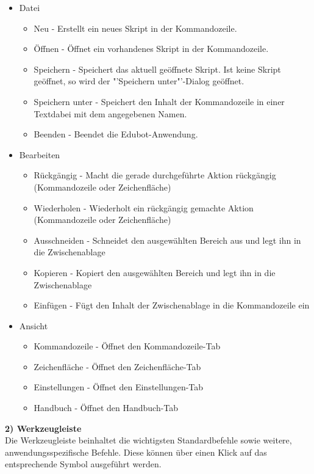 \begin{itemize}
\item Datei
\begin{itemize}
\item Neu - Erstellt ein neues Skript in der Kommandozeile.
\item Öffnen - Öffnet ein vorhandenes Skript in der Kommandozeile.
\item Speichern - Speichert das aktuell geöffnete Skript. Ist keine Skript geöffnet, so wird der "'Speichern unter"'-Dialog geöffnet.
\item Speichern unter - Speichert den Inhalt der Kommandozeile in einer Textdabei mit dem angegebenen Namen.
\item Beenden - Beendet die Edubot-Anwendung.
\end{itemize}
\item Bearbeiten
\begin{itemize}
\item Rückgängig - Macht die gerade durchgeführte Aktion rückgängig (Kommandozeile oder Zeichenfläche)
\item Wiederholen - Wiederholt ein rückgängig gemachte Aktion (Kommandozeile oder Zeichenfläche)
\item Ausschneiden - Schneidet den ausgewählten Bereich aus und legt ihn in die Zwischenablage 
\item Kopieren - Kopiert den ausgewählten Bereich und legt ihn in die Zwischenablage
\item Einfügen - Fügt den Inhalt der Zwischenablage in die Kommandozeile ein
\end{itemize}
\item Ansicht
\begin{itemize}
\item Kommandozeile - Öffnet den Kommandozeile-Tab
\item Zeichenfläche - Öffnet den Zeichenfläche-Tab
\item Einstellungen - Öffnet den Einstellungen-Tab
\item Handbuch - Öffnet den Handbuch-Tab
\end{itemize}
\end{itemize}
\textbf{2) Werkzeugleiste}\\
Die Werkzeugleiste beinhaltet die wichtigsten Standardbefehle sowie weitere, anwendungsspezifische Befehle. Diese können über einen Klick auf das entsprechende Symbol ausgeführt werden.
